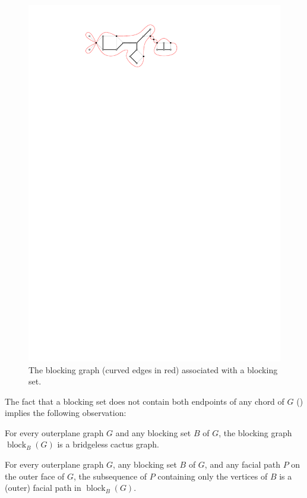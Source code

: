 \documentclass{patmorin}
\DeclareMathOperator{\block}{block}
\begin{document}
\begin{figure}
  \begin{center}
     \includegraphics{figs/blocking-set-2}
  \end{center}
  \caption{The blocking graph (curved edges in red) associated with a
           blocking set.}
\end{figure}

The fact that a blocking set does not contain both endpoints of any
chord of $G$ () implies the following observation:

\begin{obs}
   For every outerplane graph $G$ and any blocking set $B$ of $G$,
   the blocking graph $\block_B(G)$ is a bridgeless cactus graph.
\end{obs}

\begin{obs}
  For every outerplane graph $G$, any blocking set $B$ of $G$, and any
  facial path $P$ on the outer face of  $G$, the subsequence of $P$
  containing only the vertices of $B$ is a (outer) facial path in
  $\block_B(G)$.
\end{obs}
\end{document}
